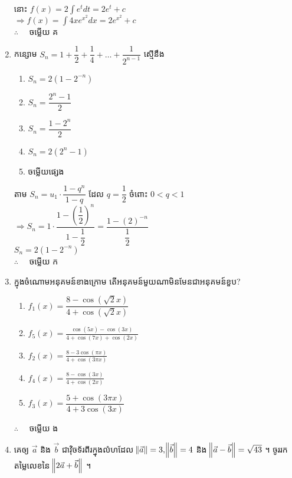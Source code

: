 \documentclass[12pt, a4paper]{article}
\begin{document}
\begin{enumerate}[m]
\begin{center}
		នោះ $f(x)=2\int e^{t}dt=2e^t+c$\\
		$\Rightarrow f(x)=\int4xe^{x^2}dx=2e^{x^2}+c$\\
		$\therefore \quad$ \kml ចម្លើយ \kbk  គ
	\end{center}
	{\color{blue}\hrulefill}
	\item កន្សោម $S_n=1+\dfrac{1}{2}+\dfrac{1}{4}+\dots+\dfrac{1}{2^{n-1}}$ ស្មើនឹង
	\begin{enumerate}[k,3]
		\item $S_n=2\left(1-2^{-n}\right)$
		\item $S_n=\dfrac{2^n-1}{2}$
		\item $S_n=\dfrac{1-2^n}{2}$
		\item $S_n=2\left(2^n-1\right)$
		\item ចម្លើយផ្សេង
	\end{enumerate}
	\answer
	\begin{center}
		តាម $S_n=u_1\cdot\dfrac{1-q^n}{1-q}$ ដែល $q=\dfrac{1}{2}$ ចំពោះ $0<q<1$\\
		$\Rightarrow S_n=1\cdot\dfrac{1-\left(\dfrac{1}{2}\right)^n}{1-\dfrac{1}{2}}=\dfrac{1-\left(2\right)^{-n}}{\dfrac{1}{2}}$\\
		$S_n=2\left(1-2^{-n}\right)$\\
		$\therefore \quad$ \kml ចម្លើយ \kbk ក
	\end{center}
	{\color{blue}\hrulefill}
	\item ក្នុងចំណោមអនុគមន៍ខាងក្រោម តើអនុគមន៍មួយណាមិនមែនជាអនុគមន៍ខួប?
	\begin{enumerate}[k,3]
		\item $f_1(x)=\dfrac{8-\cos\left(\sqrt{2}x\right)}{4+\cos\left(\sqrt{2}x\right)}$
		\item $f_5(x)=\frac{\cos\left(5x\right)-\cos\left(3x\right)}{4+\cos\left(7x\right)+\cos\left(2x\right)}$
		\item $f_2(x)=\frac{8-3\cos\left(\pi x\right)}{4+\cos\left(3\pi x\right)}$
		\item $f_4(x)=\frac{8-\cos\left(3x\right)}{4+\cos\left(2x\right)}$
		\item $f_3(x)=\dfrac{5+\cos\left(3\pi x\right)}{4+3\cos\left(3x\right)}$
	\end{enumerate}
	\answer
	\begin{center}
		$\therefore \quad$ \kml ចម្លើយ \kbk ង
	\end{center}
	{\color{blue}\hrulefill}
	\item គេឲ្យ $\vec{a}$ និង $\vec{b}$ ជាវ៉ិចទ័រពីរក្នុងលំហដែល $\norm{\vec{a}}=3, \norm{\vec{b}}=4$ និង $\norm{\vec{a}-\vec{b}}=\sqrt{43}$ ។ ចូររកតម្លៃលេខនៃ $\norm{2\vec{a}+\vec{b}}$ ។

\end{enumerate}
\end{document}
